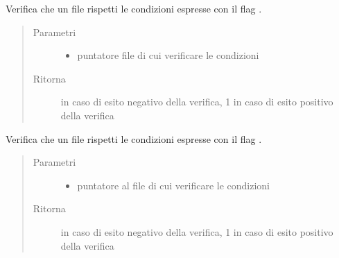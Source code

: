 \documentclass[letterpaper,10pt,italian,openany,oneside]{sphinxmanual}
\begin{document}

\begin{fulllineitems}
\label{\detokenize{code/inputscan:c.checkUID}}
Verifica che un file rispetti le condizioni espresse con il flag .
\begin{quote}\begin{description}
\item[{Parametri}] \leavevmode\begin{itemize}
\item {} 
 \textendash{} puntatore file di cui verificare le condizioni

\end{itemize}

\item[{Ritorna}]  in caso di esito negativo della verifica, 1 in caso di esito positivo della verifica

\end{description}\end{quote}

\end{fulllineitems}


\begin{fulllineitems}
\label{\detokenize{code/inputscan:c.checkGID}}
Verifica che un file rispetti le condizioni espresse con il flag .
\begin{quote}\begin{description}
\item[{Parametri}] \leavevmode\begin{itemize}
\item {} 
 \textendash{} puntatore al file di cui verificare le condizioni

\end{itemize}

\item[{Ritorna}]  in caso di esito negativo della verifica, 1 in caso di esito positivo della verifica

\end{description}\end{quote}

\end{fulllineitems}
\end{document}
